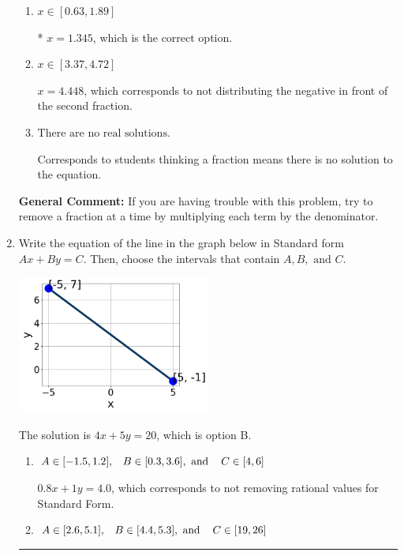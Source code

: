 \documentclass{extbook}[14pt]
\newcommand{\litem}[1]{\item #1

\rule{\textwidth}{0.4pt}}
\begin{document}
\begin{enumerate}
{\begin{enumerate}[label=\Alph*.]
 $x = 0.108$, which corresponds to dividing the second number in the numerator by the denominator rather than dividing BOTH parts of the numerator by the denominator (or removing the fractions through multiplication).
\item \( x \in [0.63, 1.89] \)

* $x = 1.345$, which is the correct option.
\item \( x \in [3.37, 4.72] \)

 $x = 4.448$, which corresponds to not distributing the negative in front of the second fraction.
\item \( \text{There are no real solutions.} \)

Corresponds to students thinking a fraction means there is no solution to the equation.
\end{enumerate}

\textbf{General Comment:} If you are having trouble with this problem, try to remove a fraction at a time by multiplying each term by the denominator.
}
\litem{
Write the equation of the line in the graph below in Standard form $Ax+By=C$. Then, choose the intervals that contain $A, B, \text{ and } C$.

\begin{center}
    \includegraphics[width=0.5\textwidth]{../Figures/linearGraphToStandardC.png}
\end{center}



The solution is \( 4x + 5y = 20 \), which is option B.\begin{enumerate}[label=\Alph*.]
\item \( A \in [-1.5, 1.2], \hspace{3mm} B \in [0.3, 3.6], \text{ and } \hspace{3mm} C \in [4, 6] \)

 $0.8x + 1y = 4.0$, which corresponds to not removing rational values for Standard Form.
\item \( A \in [2.6, 5.1], \hspace{3mm} B \in [4.4, 5.3], \text{ and } \hspace{3mm} C \in [19, 26] \)


\end{enumerate}}
\end{enumerate}
\end{document}
